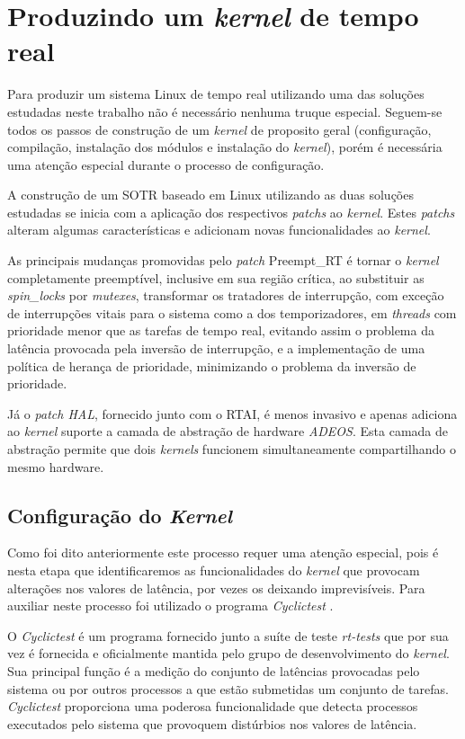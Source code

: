 \section{Produzindo um \textit{kernel} de tempo real}
Para produzir um sistema Linux de tempo real utilizando uma das soluções estudadas neste trabalho não é necessário nenhuma truque especial. Seguem-se todos os passos de construção de um \textit{kernel} de proposito geral (configuração, compilação, instalação dos módulos e instalação do \textit{kernel}), porém é necessária uma atenção especial durante o processo de configuração.

A construção de um SOTR baseado em Linux utilizando as duas soluções estudadas se inicia com a aplicação dos respectivos \textit{patchs} ao \textit{kernel}. Estes \textit{patchs} alteram algumas características e adicionam novas funcionalidades ao \textit{kernel}.

As principais mudanças promovidas pelo \textit{patch} Preempt\_RT é tornar o \textit{kernel} completamente preemptível, inclusive em sua região crítica, ao substituir as \textit{spin\_locks} por \textit{mutexes}, transformar os tratadores de interrupção, com exceção de interrupções vitais para o sistema como a dos temporizadores, em \textit{threads} com prioridade menor que as tarefas de tempo real, evitando assim o problema da latência provocada pela inversão de interrupção, e a implementação de uma política de herança de prioridade, minimizando o problema da inversão de prioridade.

Já o \textit{patch HAL}, fornecido junto com o RTAI, é menos invasivo e apenas adiciona ao \textit{kernel} suporte a camada de abstração de hardware \textit{ADEOS}. Esta camada de abstração permite que dois \textit{kernels} funcionem simultaneamente compartilhando o mesmo hardware. 

\subsection{Configuração do \textit{Kernel}}
Como foi dito anteriormente este processo requer uma atenção especial, pois é nesta etapa que identificaremos as funcionalidades do \textit{kernel} que provocam alterações nos valores de latência, por vezes os deixando imprevisíveis. Para auxiliar neste processo foi utilizado o programa \textit{Cyclictest} \cite{LinuxCyclictest2017}.

O \textit{Cyclictest} é um programa fornecido junto a suíte de teste \textit{rt-tests} que por sua vez é fornecida e oficialmente mantida pelo grupo de desenvolvimento do \textit{kernel}. Sua principal função é a medição do conjunto de latências provocadas pelo sistema ou por outros processos a que estão submetidas um conjunto de tarefas. \textit{Cyclictest} proporciona uma poderosa funcionalidade que detecta processos executados pelo sistema que provoquem distúrbios nos valores de latência.

